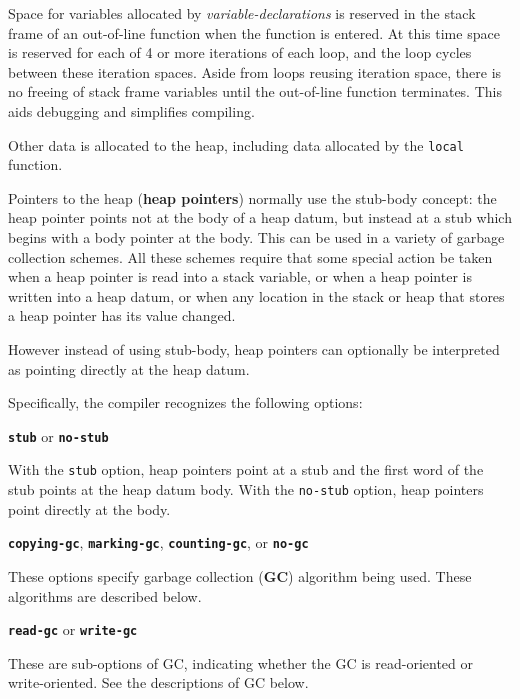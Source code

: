 \documentclass[12pt]{article}
\newcommand{\key}[1]{{\rm \bfseries #1}}
\newcommand{\ttkey}[1]{{\tt \bfseries #1}}
\newcommand{\skey}[2]{{\rm \bfseries #1#2}}
\newenvironment{indpar}[1][0.3in]%
	{\begin{list}{}%
		     {\setlength{\itemsep}{0in}%
		      \setlength{\topsep}{0in}%
		      \setlength{\parsep}{1ex}%
		      \setlength{\labelwidth}{#1}%
		      \setlength{\leftmargin}{#1}%
		      \addtolength{\leftmargin}{\labelsep}}%
	 \item}%
	{\end{list}}
\begin{document}
Space for variables allocated by {\em variable-declarations}
is reserved in the stack frame of an out-of-line function when the
function is entered.  At this
time space is reserved for each of 4 or more iterations of
each loop, and the loop cycles between these iteration spaces.
Aside from loops reusing iteration space, there is no
freeing of stack frame variables until the out-of-line function
terminates.  This aids debugging and simplifies compiling.

Other data is allocated to the heap, including data allocated
by the {\tt local} function.

Pointers to the heap (\skey{heap pointer}s) normally use the stub-body concept:
the heap pointer points not at the body of a heap datum, but instead at a
stub which begins with a body pointer at the body.  This can be
used in a variety of garbage collection schemes.  All these
schemes require that some special action be taken when a heap
pointer is read into a stack variable, or when
a heap pointer is written into a heap datum, or when any location
in the stack or heap that stores a heap pointer has its value
changed.

However instead of using stub-body, heap pointers can optionally be
interpreted as pointing directly at the heap datum.

Specifically, the compiler recognizes the following options:

\begin{indpar}

\ttkey{stub} or \ttkey{no-stub}
\begin{indpar}
With the {\tt stub} option, heap pointers point at a stub and the
first word of the stub points at the heap datum body.  With the
{\tt no-stub} option, heap pointers point directly at the body.
\end{indpar}

\ttkey{copying-gc}, \ttkey{marking-gc}, \ttkey{counting-gc}, or \ttkey{no-gc}
\begin{indpar}
These options specify garbage collection (\key{GC})
algorithm being used.  These algorithms are described below.
\end{indpar}

\ttkey{read-gc} or \ttkey{write-gc}
\begin{indpar}
These are sub-options of GC, indicating whether the GC is
read-oriented or write-oriented.  See the descriptions
of GC below.
\end{indpar}

\end{indpar}
\end{document}

